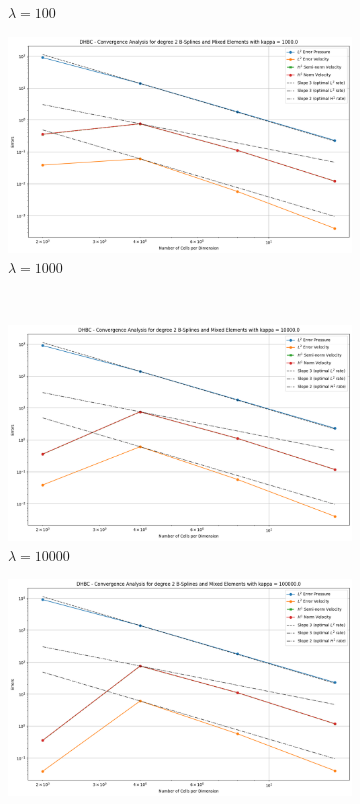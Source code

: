 \documentclass[a4paper,12pt,twoside]{report}
\begin{document}
\begin{figure}[!h]
\begin{subfigure}[b]{0.49\textwidth}
		\caption{$\lambda=100$}
	\end{subfigure}
	\begin{subfigure}[b]{0.49\textwidth}
		\centering
		\includegraphics[width=\textwidth]{convergence_degree_2_mixed_dirichlet_homogeneous_kappa=1000.0}
		\caption{$\lambda=1000$}
	\end{subfigure}
	\\
	\begin{subfigure}[b]{0.49\textwidth}
		\centering
		\includegraphics[width=\textwidth]{convergence_degree_2_mixed_dirichlet_homogeneous_kappa=10000.0}
		\caption{$\lambda=10000$}
	\end{subfigure}
	\begin{subfigure}[b]{0.49\textwidth}
		\centering
		\includegraphics[width=\textwidth]{convergence_degree_2_mixed_dirichlet_homogeneous_kappa=100000.0}

\end{subfigure}
\end{figure}
\end{document}

